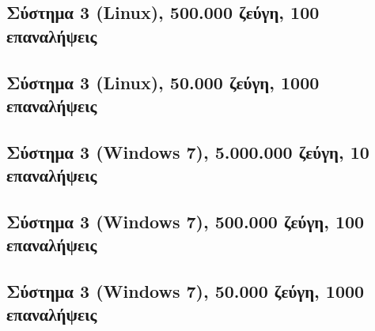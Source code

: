 \subsection*{Σύστημα 3 (Linux), 500.000 ζεύγη, 100 επαναλήψεις}\begin{center}
\tabcolsep=0.11cm
\scalebox{0.5}{
}
\scalebox{0.9}{
}\end{center}
\newpage

\subsection*{Σύστημα 3 (Linux), 50.000 ζεύγη, 1000 επαναλήψεις}\begin{center}
\tabcolsep=0.11cm
\scalebox{0.5}{
}
\scalebox{0.9}{
}\end{center}
\newpage

\subsection*{Σύστημα 3 (Windows 7), 5.000.000 ζεύγη, 10 επαναλήψεις}
\begin{center}
\tabcolsep=0.11cm
\scalebox{0.55}{}
\scalebox{0.9}{
}\end{center}
\newpage

\subsection*{Σύστημα 3 (Windows 7), 500.000 ζεύγη, 100 επαναλήψεις}\begin{center}
\tabcolsep=0.11cm
\scalebox{0.5}{
}
\scalebox{0.9}{
}\end{center}
\newpage

\subsection*{Σύστημα 3 (Windows 7), 50.000 ζεύγη, 1000 επαναλήψεις}\begin{center}
\tabcolsep=0.11cm
\scalebox{0.5}{
}
\scalebox{0.9}{
}\end{center}
\newpage
